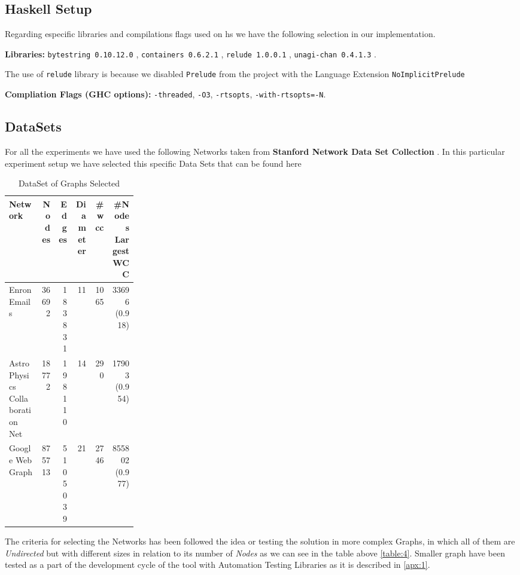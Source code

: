 \documentclass[preprint]{elsarticle}
\begin{document}
\subsection{Haskell Setup}
Regarding especific libraries and compilations flags used on \acrshort{hs} we have the following selection in our implementation.

\textbf{Libraries:} \texttt{bytestring 0.10.12.0} \cite{bytestring}, \texttt{containers 0.6.2.1} \cite{containers}, \texttt{relude 1.0.0.1} \cite{relude}, \texttt{unagi-chan 0.4.1.3} \cite{unagi}.

The use of \texttt{relude} library is because we disabled \texttt{Prelude} from the project with the Language Extension \texttt{NoImplicitPrelude} \cite{extensions}

\textbf{Compliation Flags (GHC options):} \texttt{-threaded}, \texttt{-O3}, \texttt{-rtsopts}, \texttt{-with-rtsopts=-N}.

\subsection{DataSets}\label{data:set}

For all the experiments we have used the following Networks taken from \textbf{Stanford Network Data Set Collection} \cite{stanford}. In this particular experiment setup we have selected this specific Data Sets that can be found here \cite{netenron, netastro, netwebgoogle}

\begin{table}[H]
  \centering
  \begin{tabular}{|p{0.25\linewidth}|r|r|r|r|r|}
   \hline
   \textbf{Network} & \textbf{Nodes} & \textbf{Edges} & \textbf{Diameter} & \textbf{\#\acrshort{wcc}} & \textbf{\#Nodes Largest WCC} \\
   \hline
   Enron Emails & 36692 & 183831 & 11 & 1065 & 33696 (0.918) \\
   \hline
   Astro Physics Collaboration Net & 18772 & 198110 & 14 & 290 & 17903 (0.954)\\
   \hline
   Google Web Graph & 875713 & 5105039 & 21 & 2746 & 855802 (0.977)\\
   \hline
  \end{tabular}
 \caption{DataSet of Graphs Selected}
 \label{table:4}
 \end{table}
 
 The criteria for selecting the Networks has been followed the idea or testing the solution in more complex Graphs, in which all of them are \textit{Undirected} but with different sizes in relation to its number of \textit{Nodes} as we can see in the table above \autoref{table:4}. Smaller graph have been tested as a part of the development cycle of the tool with Automation Testing Libraries as it is described in \autoref{apx:1}.
\end{document}
